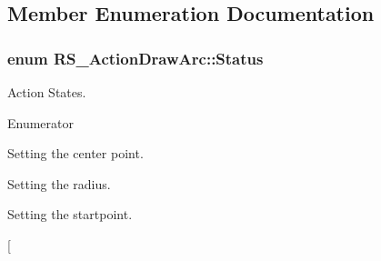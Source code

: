 \subsection{Member Enumeration Documentation}
\hypertarget{classRS__ActionDrawArc_a160ae379fa90db54ae6d365c0915eef1}{
\subsubsection[{Status}]{\setlength{\rightskip}{0pt plus 5cm}enum {\bf R\-S\-\_\-\-Action\-Draw\-Arc\-::\-Status}}}\label{classRS__ActionDrawArc_a160ae379fa90db54ae6d365c0915eef1}
Action States. \begin{Desc}
\item[Enumerator]\par
\begin{description}
\item[{\em 
\hypertarget{classRS__ActionDrawArc_a160ae379fa90db54ae6d365c0915eef1ab2004598fc140be79fa690e9f21bfa3b}{Set\-Center}\label{classRS__ActionDrawArc_a160ae379fa90db54ae6d365c0915eef1ab2004598fc140be79fa690e9f21bfa3b}
}]Setting the center point. \item[{\em 
\hypertarget{classRS__ActionDrawArc_a160ae379fa90db54ae6d365c0915eef1a0e57b9ab52ded562aeca1e97fe6b2a0f}{Set\-Radius}\label{classRS__ActionDrawArc_a160ae379fa90db54ae6d365c0915eef1a0e57b9ab52ded562aeca1e97fe6b2a0f}
}]Setting the radius. \item[{\em 
\hypertarget{classRS__ActionDrawArc_a160ae379fa90db54ae6d365c0915eef1a9d53fd3d2385376bf50c48caa62e1ce1}{Set\-Angle1}\label{classRS__ActionDrawArc_a160ae379fa90db54ae6d365c0915eef1a9d53fd3d2385376bf50c48caa62e1ce1}
}]Setting the startpoint. \item[{\em 
}
\end{description}
\end{Desc}
